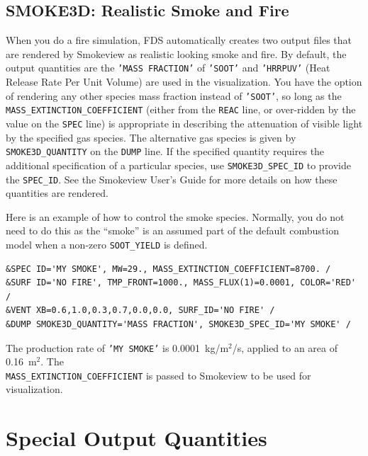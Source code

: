\documentclass[11pt]{book}
\newcommand{\ct}{\tt\small}
\begin{document}
\subsection{SMOKE3D: Realistic Smoke and Fire}

\label{info:SMOKE3D}

When you do a fire simulation, FDS automatically creates two output files that are rendered by
Smokeview as realistic looking smoke and fire. By default, the output quantities are the {\ct 'MASS FRACTION'} of {\ct 'SOOT'} and {\ct 'HRRPUV'} (Heat Release Rate Per Unit Volume)
are used in the visualization. You have the option of rendering any other species mass fraction instead of {\ct 'SOOT'}, so long as the
{\ct MASS\_EXTINCTION\_COEFFICIENT} (either from the {\ct REAC} line, or over-ridden by the value on the {\ct SPEC} line) is appropriate in
describing the attenuation of visible light by the specified gas species.
The alternative gas species is given by {\ct SMOKE3D\_QUANTITY} on the {\ct DUMP} line.
If the specified quantity requires the additional specification of a particular species,
use {\ct SMOKE3D\_SPEC\_ID} to provide the {\ct SPEC\_ID}.
See the Smokeview User's Guide for more details on how these quantities are rendered.

Here is an example of how to control the smoke species. Normally, you do not need to do this as the ``smoke'' is an assumed part of the default combustion model when a non-zero {\ct SOOT\_YIELD} is defined.

\footnotesize
\begin{verbatim}
&SPEC ID='MY SMOKE', MW=29., MASS_EXTINCTION_COEFFICIENT=8700. /
&SURF ID='NO FIRE', TMP_FRONT=1000., MASS_FLUX(1)=0.0001, COLOR='RED' /
&VENT XB=0.6,1.0,0.3,0.7,0.0,0.0, SURF_ID='NO FIRE' /
&DUMP SMOKE3D_QUANTITY='MASS FRACTION', SMOKE3D_SPEC_ID='MY SMOKE' /
\end{verbatim}

\normalsize
\noindent
The production rate of {\ct 'MY SMOKE'} is 0.0001~kg/m$^2$/s, applied to an area of 0.16~m$^2$. The \\ {\ct MASS\_EXTINCTION\_COEFFICIENT} is passed to
Smokeview to be used for visualization.






\clearpage

\section{Special Output Quantities}
\end{document}
